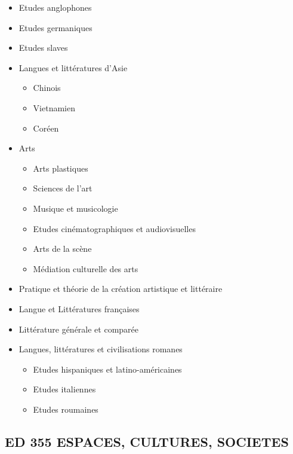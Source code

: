 		\begin{itemize}
		\item Etudes anglophones
		\item Etudes germaniques
		\item Etudes slaves
		\item Langues et littératures d'Asie
			\begin{itemize}
			\item Chinois
			\item Vietnamien
			\item Coréen
			\end{itemize}
        	\item Arts
            		\begin{itemize}
            		\item Arts plastiques 
            		\item Sciences de l'art
            		\item Musique et musicologie
            		\item Etudes cinématographiques et audiovisuelles
            		\item Arts de la scène
            		\item Médiation culturelle des arts
            		\end{itemize}
        	\item Pratique et théorie de la création artistique et littéraire
		\item Langue et Littératures françaises
		\item Littérature générale et comparée
		\item Langues, littératures et civilisations romanes 
			\begin{itemize}
			\item Etudes hispaniques et latino-américaines
			\item Etudes italiennes
			\item Etudes roumaines
			\end{itemize}
		\end{itemize}

	\subsection*{ED 355 ESPACES, CULTURES, SOCIETES}\label{ed-355-espaces-cultures-societes}

